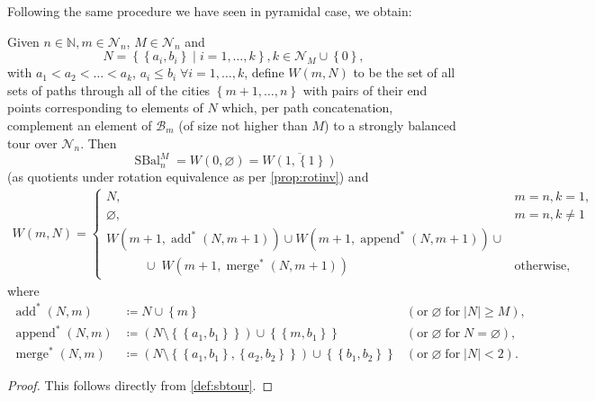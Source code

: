 \documentclass[index=totoc,bibliography=totoc]{scrartcl}
\newcommand{\annotation}[1]{\marginpar{\small\itshape\color{green}#1}}
\numberwithin{equation}{section}
\numberwithin{figure}{section}
\numberwithin{table}{section}
\begin{document}
Following the same procedure we have seen in pyramidal case, we obtain:
\begin{proposition}
\label{prop:sball}
  Given $n \in \mathbb{N}, m \in \mathcal{N}_n$, $M \in \mathcal{N}_n$
  and
  \[
    N = \left\{\left\{a_i,b_i\right\} \mid i = 1,\ldots,k \right\}, k \in \mathcal{N}_M \cup \left\{0\right\},
  \]
  with $a_1 < a_2 < \ldots < a_k$, $a_i \leq b_i \; \forall i = 1,\ldots,k$,
  define $W\left(m,N\right)$ to be the set of
  all sets of paths through all of the cities $\left\{m+1,\ldots,n\right\}$
  with pairs of their end points corresponding to elements of $N$
  which, per path concatenation,
  complement an element of $\mathcal{B}_{m}$ (of size not higher than $M$)
  to a strongly balanced tour over $\mathcal{N}_n$.
  Then
  \[
    \operatorname{SBal}_n^M =
    W\left(0,\varnothing\right) =
    \overline{W\left(1,\left\{1\right\}\right)}
  \]
  \annotation{need rotation?}
  (as quotients under rotation equivalence as per \cref{prop:rotinv}) and
  \begin{align}
    \label{eq:sbdp}
    W\left(m,N\right) =
    \begin{cases}
      N, & m = n, k = 1, \\
      \varnothing, & m = n, k \neq 1 \\
      W\left(m+1,\operatorname{add}^\ast\left(N,m+1\right)\right) \cup
        W\left(m+1,\operatorname{append}^\ast\left(N,m+1\right)\right) \cup \\
      \quad \quad \quad \cup\; W\left(m+1,\operatorname{merge}^\ast\left(N,m+1\right)\right) & \text{otherwise},
    \end{cases}
  \end{align}
  where
  \[
  \begin{alignedat}{2}
    \operatorname{add}^\ast\left(N,m\right) & \coloneqq
    N \cup \left\{m\right\}
    & (\text{or}\; \varnothing \;\text{for}\; \left|N\right| \geq M),
    \\
    \operatorname{append}^\ast\left(N,m\right) & \coloneqq
    \left(N \setminus \left\{\left\{a_1,b_1\right\}\right\}\right) \cup \left\{\left\{m,b_1\right\}\right\}
    & (\text{or}\; \varnothing \;\text{for}\; N = \varnothing),
    \\
    \operatorname{merge}^\ast\left(N,m\right) & \coloneqq
    \left(N \setminus \left\{\left\{a_1,b_1\right\},\left\{a_2,b_2\right\}\right\}\right)
      \cup \left\{\left\{b_1,b_2\right\}\right\}
    & (\text{or}\; \varnothing \;\text{for}\; \left|N\right| < 2).
  \end{alignedat}
  \]
\end{proposition}
\begin{proof}
  This follows directly from \cref{def:sbtour}.
\end{proof}
\end{document}
